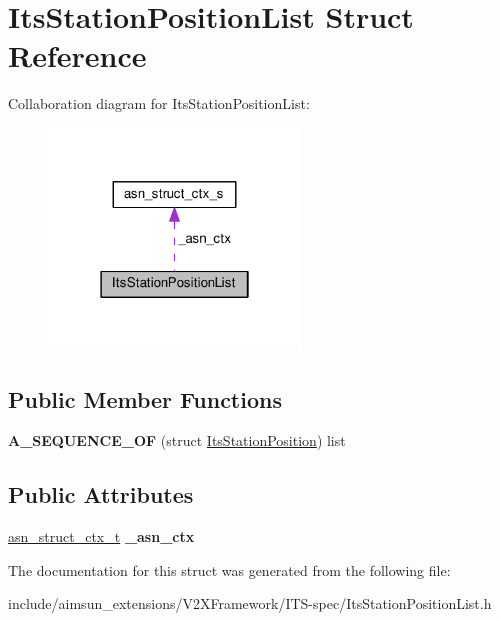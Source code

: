 \hypertarget{structItsStationPositionList}{}\section{Its\+Station\+Position\+List Struct Reference}
\label{structItsStationPositionList}


Collaboration diagram for Its\+Station\+Position\+List\+:\nopagebreak
\begin{figure}[H]
\begin{center}
\leavevmode
\includegraphics[width=190pt]{structItsStationPositionList__coll__graph}
\end{center}
\end{figure}
\subsection*{Public Member Functions}
\begin{DoxyCompactItemize}
\item 
{\bfseries A\+\_\+\+S\+E\+Q\+U\+E\+N\+C\+E\+\_\+\+OF} (struct \hyperlink{structItsStationPosition}{Its\+Station\+Position}) list\hypertarget{structItsStationPositionList_a252ea0f8301778af775abf8f02d50f78}{}\label{structItsStationPositionList_a252ea0f8301778af775abf8f02d50f78}

\end{DoxyCompactItemize}
\subsection*{Public Attributes}
\begin{DoxyCompactItemize}
\item 
\hyperlink{structasn__struct__ctx__s}{asn\+\_\+struct\+\_\+ctx\+\_\+t} {\bfseries \+\_\+asn\+\_\+ctx}\hypertarget{structItsStationPositionList_a5e2ede55631ccd3df0ead1e9e7636a88}{}\label{structItsStationPositionList_a5e2ede55631ccd3df0ead1e9e7636a88}

\end{DoxyCompactItemize}


The documentation for this struct was generated from the following file\+:\begin{DoxyCompactItemize}
\item 
include/aimsun\+\_\+extensions/\+V2\+X\+Framework/\+I\+T\+S-\/spec/Its\+Station\+Position\+List.\+h\end{DoxyCompactItemize}
